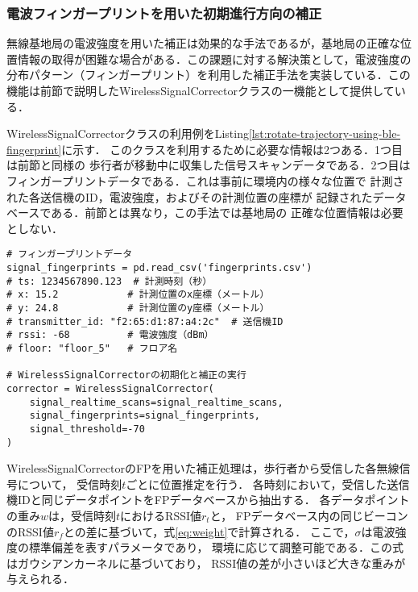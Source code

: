 
\subsubsection{電波フィンガープリントを用いた初期進行方向の補正}
無線基地局の電波強度を用いた補正は効果的な手法であるが，基地局の正確な位置情報の取得が困難な場合がある．この課題に対する解決策として，電波強度の分布パターン（フィンガープリント）を利用した補正手法を実装している．この機能は前節で説明したWirelessSignalCorrectorクラスの一機能として提供している．

WirelessSignalCorrectorクラスの利用例をListing\ref{lst:rotate-trajectory-using-ble-fingerprint}に示す．
このクラスを利用するために必要な情報は2つある．1つ目は前節と同様の
歩行者が移動中に収集した信号スキャンデータである．2つ目は
フィンガープリントデータである．これは事前に環境内の様々な位置で
計測された各送信機のID，電波強度，およびその計測位置の座標が
記録されたデータベースである．前節とは異なり，この手法では基地局の
正確な位置情報は必要としない．

\begin{lstlisting}[caption={WirelessSignalCorrectorの使用例},label=lst:rotate-trajectory-using-fingerprint,float=ht]
# フィンガープリントデータ
signal_fingerprints = pd.read_csv('fingerprints.csv')
# ts: 1234567890.123  # 計測時刻（秒）
# x: 15.2            # 計測位置のx座標（メートル）
# y: 24.8            # 計測位置のy座標（メートル）
# transmitter_id: "f2:65:d1:87:a4:2c"  # 送信機ID
# rssi: -68          # 電波強度（dBm）
# floor: "floor_5"   # フロア名

# WirelessSignalCorrectorの初期化と補正の実行
corrector = WirelessSignalCorrector(
    signal_realtime_scans=signal_realtime_scans,
    signal_fingerprints=signal_fingerprints,
    signal_threshold=-70
)
\end{lstlisting}

WirelessSignalCorrectorのFPを用いた補正処理は，歩行者から受信した各無線信号について，
受信時刻$t$ごとに位置推定を行う．
各時刻において，受信した送信機IDと同じデータポイントをFPデータベースから抽出する．
各データポイントの重み$w$は，受信時刻$t$におけるRSSI値$r_t$と，
FPデータベース内の同じビーコンのRSSI値$r_f$との差に基づいて，式\eqref{eq:weight}で計算される．
ここで，$\sigma$は電波強度の標準偏差を表すパラメータであり，
環境に応じて調整可能である．この式はガウシアンカーネルに基づいており，
RSSI値の差が小さいほど大きな重みが与えられる．

